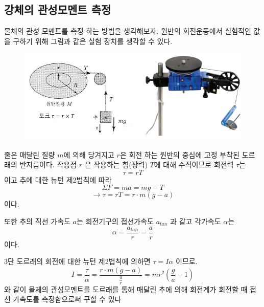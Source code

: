 \documentclass[12pt,a4paper]{article}
\begin{document}
\subsection{강체의 관성모멘트 측정}
물체의 관성 모멘트를 측정 하는 방법을 생각해보자. 원반의 회전운동에서 실험적인 값을
구하기 위해 그림과 같은 실험 장치를 생각할 수 있다.
\begin{figure}[h!]
    \centering
    \includegraphics[width=15cm]{2024-05-26 225621.png}
\end{figure}
\clearpage
줄은 매달린 질량 $m$에 의해 당겨지고 $r$은 회전 하는 원반의 중심에 고정 부착된
도르래의 반지름이다. 작용점 $r$ 은 작용하는 힘(장력) $T$에 대해 수직이므로
회전력 $\tau$는
$$\tau=rT$$
이고 추에 대한 뉴턴 제2법칙에 따라
$$\Sigma F = ma = mg - T$$
$$\rightarrow \tau = rT = r\cdot m(g-a)$$
이다.

또한 추의 직선 가속도 $a$는 회전기구의 접선가속도 $a_{tan}$ 과 같고 각가속도
$\alpha$는
$$\alpha = \frac{a_{tan}}{r}=\frac{a}{r}$$
이다.

3단 도르래의 회전에 대한 뉴턴 제2법칙에 의하면 $\tau=I\alpha$ 이므로.
$$I=\frac{\tau}{\alpha}=\frac{r\cdot m(g-a)}{\frac{a}{r}}=mr^2(\frac{g}{a}-1)$$
와 같이 물체의 관성모멘트를 도르래를 통해 매달린 추에 의해 회전계가 회전할 때
접선 가속도를 측정함으로써 구할 수 있다
\end{document}
